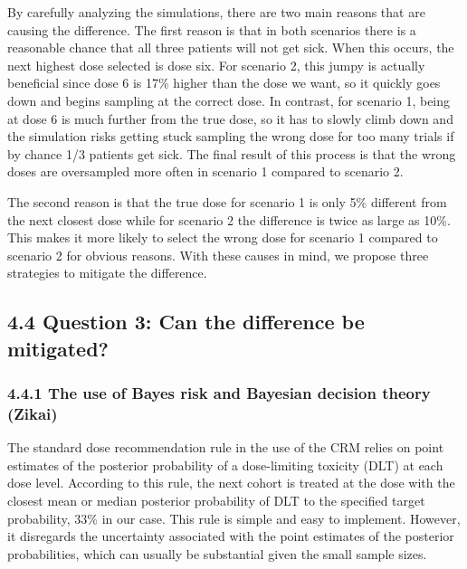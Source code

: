 \documentclass[
]{article}
\begin{document}
By carefully analyzing the simulations, there are two main reasons that
are causing the difference. The first reason is that in both scenarios
there is a reasonable chance that all three patients will not get sick.
When this occurs, the next highest dose selected is dose six. For
scenario 2, this jumpy is actually beneficial since dose 6 is 17\%
higher than the dose we want, so it quickly goes down and begins
sampling at the correct dose. In contrast, for scenario 1, being at dose
6 is much further from the true dose, so it has to slowly climb down and
the simulation risks getting stuck sampling the wrong dose for too many
trials if by chance 1/3 patients get sick. The final result of this
process is that the wrong doses are oversampled more often in scenario 1
compared to scenario 2.

The second reason is that the true dose for scenario 1 is only 5\%
different from the next closest dose while for scenario 2 the difference
is twice as large as 10\%. This makes it more likely to select the wrong
dose for scenario 1 compared to scenario 2 for obvious reasons. With
these causes in mind, we propose three strategies to mitigate the
difference.

\hypertarget{question-3-can-the-difference-be-mitigated}{%
\subsection{4.4 Question 3: Can the difference be
mitigated?}\label{question-3-can-the-difference-be-mitigated}}

\hypertarget{the-use-of-bayes-risk-and-bayesian-decision-theory-zikai}{%
\subsubsection{4.4.1 The use of Bayes risk and Bayesian decision theory
(Zikai)}\label{the-use-of-bayes-risk-and-bayesian-decision-theory-zikai}}

The standard dose recommendation rule in the use of the CRM relies on
point estimates of the posterior probability of a dose-limiting toxicity
(DLT) at each dose level. According to this rule, the next cohort is
treated at the dose with the closest mean or median posterior
probability of DLT to the specified target probability, 33\% in our
case. This rule is simple and easy to implement. However, it disregards
the uncertainty associated with the point estimates of the posterior
probabilities, which can usually be substantial given the small sample
sizes.
\end{document}
